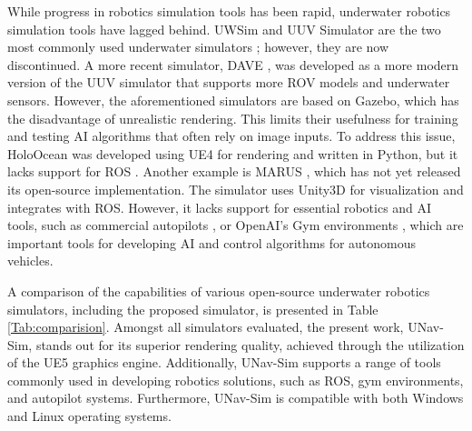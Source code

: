 While progress in robotics simulation tools has been rapid, underwater robotics simulation tools have lagged behind. UWSim \cite{uwsim} and UUV Simulator \cite{uuv} are the two most commonly used underwater simulators \cite{survey}; however, they are now discontinued. %
A more recent simulator, DAVE \cite{dave}, was developed as a more modern version of the UUV simulator that supports more \ac{ROV} models and underwater sensors. However, the aforementioned simulators are based on Gazebo, which has the disadvantage of unrealistic rendering. This limits their usefulness for training and testing \ac{AI} algorithms that often rely on image inputs. To address this issue, HoloOcean \cite{holoocean} was developed using \ac{UE4} for rendering and written in Python, but it lacks support for \ac{ROS} \cite{ros}. Another example is MARUS \cite{marus}, which has not yet released its open-source implementation. The simulator uses Unity3D for visualization and integrates with \ac{ROS}. However, it lacks support for essential robotics and \ac{AI} tools, such as commercial autopilots \cite{px4}, or OpenAI's Gym environments \cite{gym}, which are important tools for developing \ac{AI} and control algorithms for autonomous vehicles.
%
\begin{table*}[t]
\caption{Marine robotics simulators comparison showing UNav-Sim's superior rendering quality and versatility.}
\centering
{}
\label{Tab:comparision}
\end{table*}
%

A comparison of the capabilities of various open-source underwater robotics simulators, including the proposed simulator, is presented in Table \ref{Tab:comparision}. Amongst all simulators evaluated, the present work, UNav-Sim, stands out for its superior rendering quality, achieved through the utilization of the \ac{UE}5 graphics engine. Additionally, UNav-Sim supports a range of tools commonly used in developing robotics solutions, such as \ac{ROS}, gym environments, and autopilot systems. Furthermore, UNav-Sim is compatible with both Windows and Linux operating systems.

